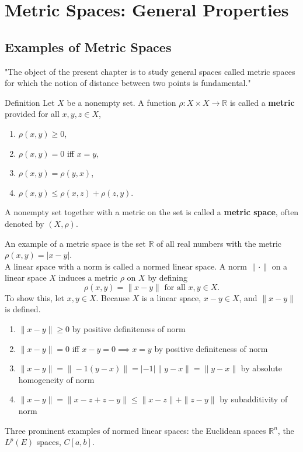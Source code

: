 \chapter{Metric Spaces: General Properties}

\section{Examples of Metric Spaces}
\begin{flushleft}

"The object of the present chapter is to study general spaces called metric spaces for which the notion of distance between two points is fundamental."

\begin{namedthm*}{Definition}
    Let $X$ be a nonempty set. A function $\rho:X\times X\to\mathbb{R}$ is called a \textbf{metric} provided for all $x,y,z\in X$,
    \begin{enumerate}[label=(\roman*),align=right]
        \item $\rho(x,y)\ge0$,
        \item $\rho(x,y)=0$ iff $x=y$,
        \item $\rho(x,y)=\rho(y,x)$,
        \item $\rho(x,y)\le\rho(x,z)+\rho(z,y)$.
    \end{enumerate}
    A nonempty set together with a metric on the set is called a \textbf{metric space}, often denoted by $(X,\rho)$.
\end{namedthm*}

An example of a metric space is the set $\mathbb{R}$ of all real numbers with the metric $\rho(x,y) = |x-y|$. \\

A linear space with a norm is called a normed linear space.
A norm $\|\cdot\|$ on a linear space $X$ induces a metric $\rho$ on $X$ by defining
\[
    \rho(x,y)=\|x-y\|\text{ for all }x,y\in X.  
\]
To show this, let $x,y\in X$. Because $X$ is a linear space, $x-y \in X$, and $\|x-y\|$ is defined.
\begin{enumerate}[label=(\roman*),align=right]
    \item $\|x-y\|\ge0$ by positive definiteness of norm
    \item $\|x-y\|=0$ iff $x-y=0 \implies x=y$ by positive definiteness of norm
    \item $\|x-y\|=\|-1(y-x)\|=|-1|\|y-x\|=\|y-x\|$ by absolute homogeneity of norm
    \item $\|x-y\|= \|x-z+z-y\|\le\|x-z\|+\|z-y\|$ by subadditivity of norm
\end{enumerate}

Three prominent examples of normed linear spaces:
the Euclidean spaces $\mathbb{R}^n$, 
the $L^p(E)$ spaces,
$C[a,b]$.



\end{flushleft}
